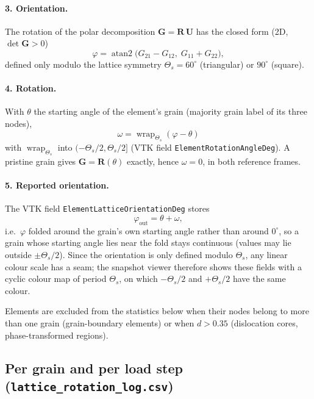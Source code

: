\documentclass[11pt,a4paper]{article}
\newcommand{\code}[1]{\texttt{#1}}
\begin{document}
\paragraph{3. Orientation.} The rotation of the polar decomposition $\mathbf{G} = \mathbf{R}\,\mathbf{U}$ has the closed form (2D, $\det\mathbf{G} > 0$)
\begin{equation}
  \boxed{\varphi = \operatorname{atan2}\!\big(G_{21} - G_{12},\; G_{11} + G_{22}\big),}
\end{equation}
defined only modulo the lattice symmetry $\Theta_s = 60^\circ$ (triangular) or $90^\circ$ (square).

\paragraph{4. Rotation.} With $\theta$ the starting angle of the element's grain (majority grain label of its three nodes),
\begin{equation}
  \boxed{\omega = \operatorname{wrap}_{\Theta_s}(\varphi - \theta)}
\end{equation}
with $\operatorname{wrap}_{\Theta_s}$ into $(-\Theta_s/2, \Theta_s/2]$ (VTK field \code{ElementRotationAngleDeg}). A pristine grain gives $\mathbf{G} = \mathbf{R}(\theta)$ exactly, hence $\omega = 0$, in both reference frames.

\paragraph{5. Reported orientation.} The VTK field \code{ElementLatticeOrientationDeg} stores
\begin{equation}
  \varphi_{\text{out}} = \theta + \omega,
\end{equation}
i.e.\ $\varphi$ folded around the grain's own starting angle rather than around $0^\circ$, so a grain whose starting angle lies near the fold stays continuous (values may lie outside $\pm\Theta_s/2$). Since the orientation is only defined modulo $\Theta_s$, any linear colour scale has a seam; the snapshot viewer therefore shows these fields with a cyclic colour map of period $\Theta_s$, on which $-\Theta_s/2$ and $+\Theta_s/2$ have the same colour.

Elements are excluded from the statistics below when their nodes belong to more than one grain (grain-boundary elements) or when $d > 0.35$ (dislocation cores, phase-transformed regions).

\subsection{Per grain and per load step (\code{lattice\_rotation\_log.csv})}
\end{document}

